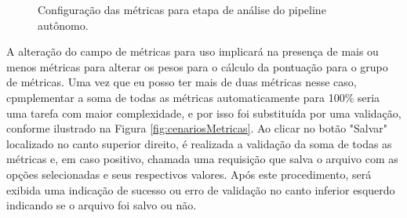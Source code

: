 \documentclass[portugues]{ic-tese}
\begin{document}
\begin{figure}[H]
    \centering
    \caption{Configuração das métricas para etapa de análise do pipeline autônomo.}
    \label{fig:configMetricas}
\end{figure}

A alteração do campo de métricas para uso implicará na presença de mais ou menos métricas para alterar os pesos para o cálculo da pontuação para o grupo de métricas. Uma vez que eu posso ter mais de duas métricas nesse caso, cpmplementar a soma de todas as métricas automaticamente para 100\% seria uma tarefa com maior complexidade, e por isso foi substituída por uma validação, conforme ilustrado na Figura \ref{fig:cenariosMetricas}. Ao clicar no botão "Salvar" localizado no canto superior direito, é realizada a validação da soma de todas as métricas e, em caso positivo, chamada uma requisição que salva o arquivo com as opções selecionadas e seus respectivos valores. Após este procedimento, será exibida uma indicação de sucesso ou erro de validação no canto inferior esquerdo indicando se o arquivo foi salvo ou não.
\end{document}
